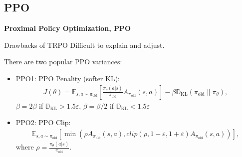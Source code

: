 \subsection{PPO}
\begin{frame}
    \textbf{Proximal Policy Optimization, PPO}
    \begin{block}{Drawbacks of TRPO}
        Difficult to explain and adjust.
    \end{block}

    There are two popular PPO variances:
    \begin{itemize}
        \item  PPO1: PPO Penality (softer KL):
        \begin{align*}
            J(\theta) = 
                \mathbb{E}_{s,a \sim \pi_{\text{old}}}
                \left[
                    \frac{\pi_\theta(a|s)}{\pi_{\text{old}}} A_{\pi_{\text{old}}}(s,a)
                \right] 
                - \beta \mathbb{D}_{\text{KL}}(\pi_{\text{old}}\| \pi_\theta),
        \end{align*}
        $\beta =2\beta$ if $\mathbb{D}_{\text{KL}} > 1.5\varepsilon$, $\beta=\beta/2$ if $\mathbb{D}_{\text{KL}} < 1.5\varepsilon$
        \item PPO2: PPO Clip:
        \begin{align*}
            \mathbb{E}_{s,a \sim \pi_{\text{old}}}
                \left[
                    \min \left(
                        \rho A_{\pi_{\text{old}}}(s,a),
                        clip(\rho, 1 - \varepsilon, 1 + \varepsilon)A_{\pi_{\text{old}}}(s,a)
                    \right)
                \right] ,
        \end{align*}
        where $\rho = \frac{\pi_\theta(a|s)}{\pi_{\text{old}}}$.
    \end{itemize}
\end{frame}
